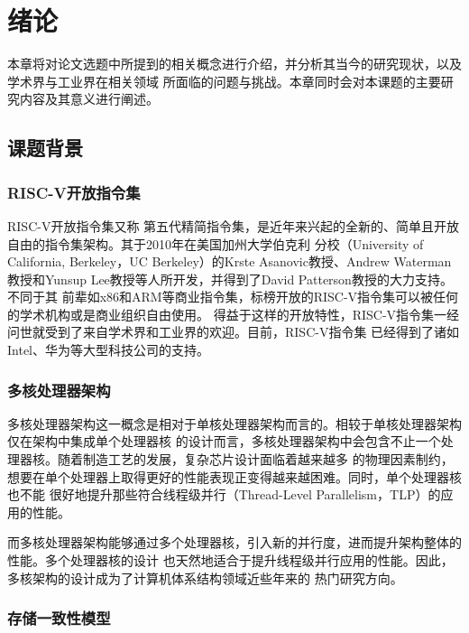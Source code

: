 
\section{绪论}

本章将对论文选题中所提到的相关概念进行介绍，并分析其当今的研究现状，以及学术界与工业界在相关领域
所面临的问题与挑战。本章同时会对本课题的主要研究内容及其意义进行阐述。

\subsection{课题背景}

\subsubsection{RISC-V开放指令集}
\label{section:background_riscv}

RISC-V开放指令集\cite{waterman2016design}又称
第五代精简指令集，是近年来兴起的全新的、简单且开放自由的指令集架构。其于2010年在美国加州大学伯克利
分校（University of California, Berkeley，UC Berkeley）的Krste Asanovic教授、Andrew
Waterman教授和Yunsup Lee教授等人所开发，并得到了David Patterson教授的大力支持。不同于其
前辈如x86和ARM等商业指令集，标榜开放的RISC-V指令集可以被任何的学术机构或是商业组织自由使用。
得益于这样的开放特性，RISC-V指令集一经问世就受到了来自学术界和工业界的欢迎。目前，RISC-V指令集
已经得到了诸如Intel、华为等大型科技公司的支持\cite{riscvmember}。

\subsubsection{多核处理器架构}
\label{section:background_manycore}

多核处理器架构这一概念是相对于单核处理器架构而言的。相较于单核处理器架构仅在架构中集成单个处理器核
的设计而言，多核处理器架构中会包含不止一个处理器核。随着制造工艺的发展，复杂芯片设计面临着越来越多
的物理因素制约，想要在单个处理器上取得更好的性能表现正变得越来越困难。同时，单个处理器核也不能
很好地提升那些符合线程级并行（Thread-Level Parallelism，TLP）的应用的性能。

而多核处理器架构能够通过多个处理器核，引入新的并行度，进而提升架构整体的性能。多个处理器核的设计
也天然地适合于提升线程级并行应用的性能。因此，多核架构的设计成为了计算机体系结构领域近些年来的
热门研究方向。

\subsubsection{存储一致性模型}
\label{section:background_consistent_model}

